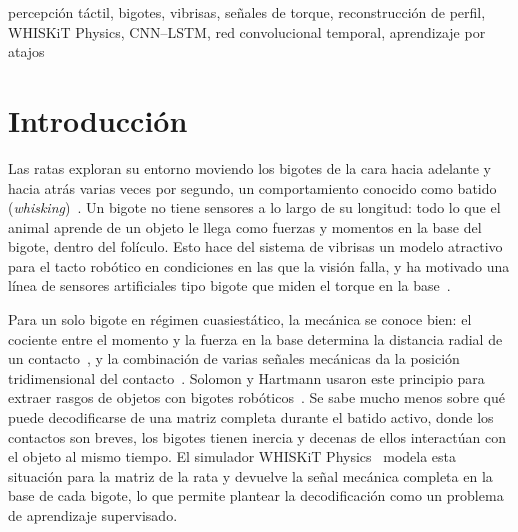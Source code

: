 \documentclass[conference]{IEEEtran}
\begin{document}
\begin{IEEEkeywords}
percepción táctil, bigotes, vibrisas, señales de torque, reconstrucción de perfil, WHISKiT Physics, CNN--LSTM, red convolucional temporal, aprendizaje por atajos
\end{IEEEkeywords}

\section{Introducción}
Las ratas exploran su entorno moviendo los bigotes de la cara hacia adelante y hacia atrás varias veces por segundo, un comportamiento conocido como batido (\emph{whisking})~\cite{mitchinson2011}. Un bigote no tiene sensores a lo largo de su longitud: todo lo que el animal aprende de un objeto le llega como fuerzas y momentos en la base del bigote, dentro del folículo. Esto hace del sistema de vibrisas un modelo atractivo para el tacto robótico en condiciones en las que la visión falla, y ha motivado una línea de sensores artificiales tipo bigote que miden el torque en la base~\cite{kaneko1998,solomon2006,pearson2011,lepora2018}.

Para un solo bigote en régimen cuasiestático, la mecánica se conoce bien: el cociente entre el momento y la fuerza en la base determina la distancia radial de un contacto~\cite{kaneko1998,birdwell2007}, y la combinación de varias señales mecánicas da la posición tridimensional del contacto~\cite{huet2017}. Solomon y Hartmann usaron este principio para extraer rasgos de objetos con bigotes robóticos~\cite{solomon2006}. Se sabe mucho menos sobre qué puede decodificarse de una matriz completa durante el batido activo, donde los contactos son breves, los bigotes tienen inercia y decenas de ellos interactúan con el objeto al mismo tiempo. El simulador WHISKiT Physics~\cite{zweifel2021} modela esta situación para la matriz de la rata y devuelve la señal mecánica completa en la base de cada bigote, lo que permite plantear la decodificación como un problema de aprendizaje supervisado.
\end{document}

